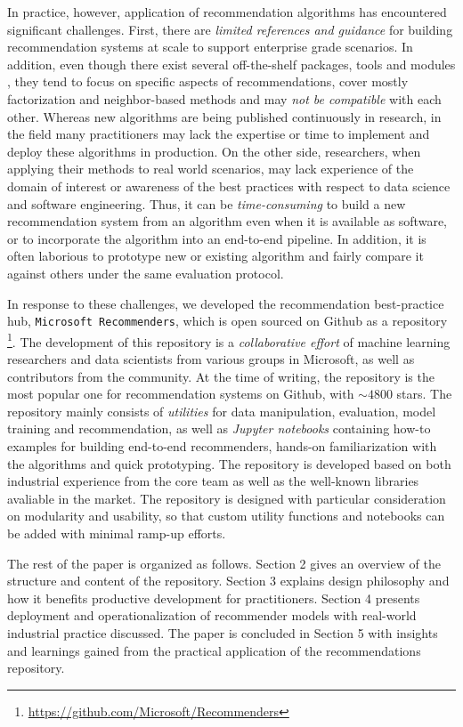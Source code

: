 In practice, however, application of recommendation algorithms has encountered significant challenges. 
First, there are {\em limited references and guidance} for building recommendation systems at scale to support
enterprise grade scenarios. In addition, even though there exist several off-the-shelf packages, tools and 
modules \cite{mymedia,Surprise,spotlight,caserec,lenskit}, 
they tend to focus on specific aspects of recommendations, 
cover mostly factorization and neighbor-based methods 
and may {\em not be compatible} with each other. Whereas new algorithms are being published continuously in research, in the field many practitioners may lack the 
expertise or time to implement and deploy these algorithms in production. 
On the other side, researchers, when applying their methods to real world scenarios, may lack experience of the domain of interest
or awareness of the best practices with respect to data science and software engineering. Thus, it can be {\em time-consuming} to build a new recommendation system from an
algorithm even when it is available as software, or to incorporate the algorithm into an end-to-end pipeline. In addition, it is often laborious to prototype new or existing algorithm and fairly compare it against others under the same evaluation protocol. 

In response to these challenges, we developed the recommendation best-practice hub, \verb|Microsoft Recommenders|, which is open sourced on Github as a repository
\footnote{\url{https://github.com/Microsoft/Recommenders}}.
The development of this repository is a {\em collaborative effort} of machine learning researchers and data scientists from 
various groups in Microsoft, as well as contributors from the community.
At the time of writing, the repository is the most popular one for recommendation systems on Github, with $\sim4800$ stars. The repository mainly consists of {\em utilities} for data manipulation, evaluation, 
model training and recommendation, as well as {\em Jupyter notebooks} containing how-to examples for building end-to-end recommenders, hands-on familiarization with the algorithms and quick prototyping. 
The repository is developed based on both industrial experience from the core team as well as the well-known libraries avaliable in the market.
The repository is designed with particular consideration on modularity and usability, so that custom utility functions and notebooks can be added with minimal ramp-up efforts.

The rest of the paper is organized as follows. Section 2 gives an overview of the structure and content of the repository. Section 3 explains design philosophy and how it benefits productive development for practitioners. Section 4 presents deployment and operationalization of recommender models with real-world industrial practice discussed. The paper is concluded in Section 5 with insights and learnings gained from the practical application of the recommendations repository.

